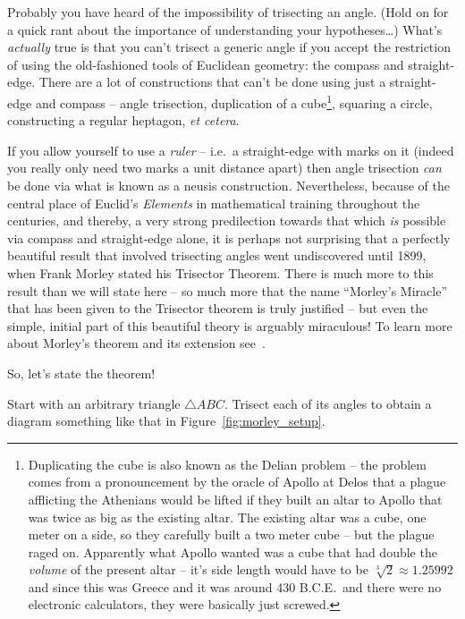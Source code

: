 Probably you have heard of the impossibility of trisecting an angle.  
(Hold on for a quick rant about the importance of understanding your
hypotheses\ldots)  What's \emph{actually} true is that you can't trisect
a generic angle if you accept the restriction of using the old-fashioned
tools of Euclidean geometry: the compass and straight-edge.  There 
are a lot of constructions that can't be done using just a 
straight-edge and compass
-- angle trisection, duplication of a cube\footnote{Duplicating the cube 
is also known as the Delian problem -- the problem comes from a pronouncement
by the oracle of Apollo at Delos that a plague afflicting the Athenians would
be lifted if they built an altar to Apollo that was twice as big as the 
existing altar.  The existing altar was a cube, one meter on a side, so they
carefully built a two meter cube -- but the plague raged on.  Apparently what
Apollo wanted was a cube that had double the \emph{volume} of the 
present altar -- it's side length would have to be 
$\sqrt[3]{2} \approx 1.25992$ and since this was Greece and it was around 
430 B.C.E.\ and there were no electronic calculators, they were basically
just screwed.}, squaring a circle, constructing a regular heptagon, \emph{et cetera}.

If you allow yourself to use a \emph{ruler} -- i.e.\ a straight-edge with
marks on it (indeed you really only need two marks a unit distance apart) 
then angle trisection \emph{can} be done via what is known as a 
neusis construction.
Nevertheless, because of the central place of Euclid's \emph{Elements} in
mathematical training throughout the centuries, and thereby, a very
strong predilection towards that which \emph{is} possible via compass and straight-edge
alone, it is perhaps not surprising that a perfectly beautiful result that
involved trisecting angles went undiscovered until 1899, when Frank Morley
stated his Trisector Theorem.  There is much more to this result than we will
state here -- so much more that the name ``Morley's Miracle'' that has been
given to the Trisector theorem is truly justified -- but even the simple,
initial part of this beautiful theory is arguably miraculous!  To learn more
about Morley's theorem and its extension see~\cite{lighthouse}.

So, let's state the theorem!

Start with an arbitrary triangle ${\triangle}ABC$.  Trisect each of its angles
to obtain a diagram something like that in Figure~\ref{fig:morley_setup}.

